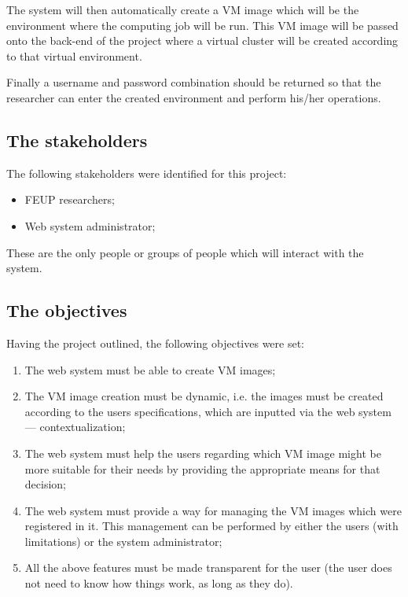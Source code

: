 The system will then automatically create a VM image which will be the environment where the computing job will be run. This VM image will be passed onto the back-end of the project where a virtual cluster will be created according to that virtual environment.

Finally a username and password combination should be returned so that the researcher can enter the created environment and perform his/her operations. 

\subsection{The stakeholders}\label{subsec:stakeholders}

The following stakeholders were identified for this project:

\begin{itemize}
\item FEUP researchers;
\item Web system administrator;
\end{itemize} 

These are the only people or groups of people which will interact with the system.

\subsection{The objectives}\label{subsec:objectives}

Having the project outlined, the following objectives were set:

\begin{enumerate}
\item The web system must be able to create VM images;
\item The VM image creation must be dynamic, i.e. the images must be created according to the users specifications, which are inputted via the web system --- contextualization;
\item The web system must help the users regarding which VM image might be more suitable for their needs by providing the appropriate means for that decision;
\item The web system must provide a way for managing the VM images which were registered in it. This management can be performed by either the users (with limitations) or the system administrator;
\item All the above features must be made transparent for the user (the user does not need to know how things work, as long as they do).
\end{enumerate}

